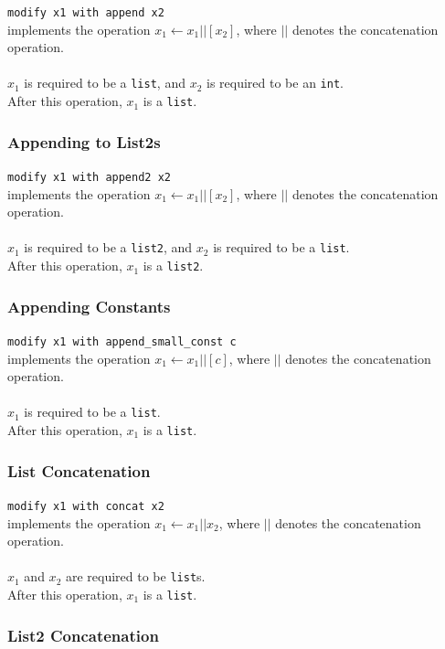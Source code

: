 \documentclass[11pt]{report}
\begin{document}
\texttt{modify x1 with append x2} \\
implements the operation $x_1 \leftarrow x_1 || [x_2]$, where $||$ denotes the concatenation operation. \\ \\
$x_1$ is required to be a \texttt{list}, and $x_2$ is required to be an \texttt{int}. \\
After this operation, $x_1$ is a \texttt{list}.

\subsubsection{Appending to List2s}

\texttt{modify x1 with append2 x2} \\
implements the operation $x_1 \leftarrow x_1 || [x_2]$, where $||$ denotes the concatenation operation. \\ \\
$x_1$ is required to be a \texttt{list2}, and $x_2$ is required to be a \texttt{list}. \\
After this operation, $x_1$ is a \texttt{list2}.

\subsubsection{Appending Constants}

\texttt{modify x1 with append\_small\_const c} \\
implements the operation $x_1 \leftarrow x_1 || [c]$, where $||$ denotes the concatenation operation. \\ \\
$x_1$ is required to be a \texttt{list}. \\
After this operation, $x_1$ is a \texttt{list}.

\subsubsection{List Concatenation}

\texttt{modify x1 with concat x2} \\
implements the operation $x_1 \leftarrow x_1 || x_2$, where $||$ denotes the concatenation operation. \\ \\
$x_1$ and $x_2$ are required to be \texttt{list}s. \\
After this operation, $x_1$ is a \texttt{list}.

\subsubsection{List2 Concatenation}
\end{document}
